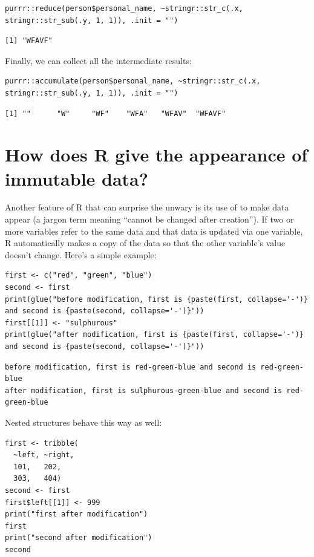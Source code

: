 \begin{lstlisting}
purrr::reduce(person$personal_name, ~stringr::str_c(.x, stringr::str_sub(.y, 1, 1)), .init = "")
\end{lstlisting}

\begin{lstlisting}
[1] "WFAVF"
\end{lstlisting}

\noindent
Finally,
we can collect all the intermediate results:

\begin{lstlisting}
purrr::accumulate(person$personal_name, ~stringr::str_c(.x, stringr::str_sub(.y, 1, 1)), .init = "")
\end{lstlisting}

\begin{lstlisting}
[1] ""      "W"     "WF"    "WFA"   "WFAV"  "WFAVF"
\end{lstlisting}

\section{How does R give the appearance of immutable data?}

Another feature of R that can surprise the unwary is its use of 
to make data appear 
(a jargon term meaning ``cannot be changed after creation'').
If two or more variables refer to the same data
and that data is updated via one variable,
R automatically makes a copy of the data so that the other variable's value doesn't change.
Here's a simple example:

\begin{lstlisting}
first <- c("red", "green", "blue")
second <- first
print(glue("before modification, first is {paste(first, collapse='-')} and second is {paste(second, collapse='-')}"))
first[[1]] <- "sulphurous"
print(glue("after modification, first is {paste(first, collapse='-')} and second is {paste(second, collapse='-')}"))
\end{lstlisting}

\begin{lstlisting}
before modification, first is red-green-blue and second is red-green-blue
after modification, first is sulphurous-green-blue and second is red-green-blue
\end{lstlisting}

Nested structures behave this way as well:

\begin{lstlisting}
first <- tribble(
  ~left, ~right,
  101,   202,
  303,   404)
second <- first
first$left[[1]] <- 999
print("first after modification")
first
print("second after modification")
second
\end{lstlisting}

